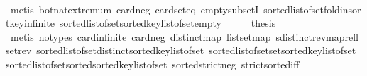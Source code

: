 \begin{isabellebody}
\ \ \ \ \isamarkupfalse%
\ {\isacharparenleft}{\kern0pt}metis\ bot{\isacharunderscore}{\kern0pt}nat{\isacharunderscore}{\kern0pt}{}{\isachardot}{\kern0pt}extremum\ card{\isacharunderscore}{\kern0pt}neg\ card{\isacharunderscore}{\kern0pt}seteq\ empty{\isacharunderscore}{\kern0pt}subsetI\ sorted{\isacharunderscore}{\kern0pt}list{\isacharunderscore}{\kern0pt}of{\isacharunderscore}{\kern0pt}set{\isachardot}{\kern0pt}fold{\isacharunderscore}{\kern0pt}insort{\isacharunderscore}{\kern0pt}key{\isachardot}{\kern0pt}infinite\ sorted{\isacharunderscore}{\kern0pt}list{\isacharunderscore}{\kern0pt}of{\isacharunderscore}{\kern0pt}set{\isachardot}{\kern0pt}sorted{\isacharunderscore}{\kern0pt}key{\isacharunderscore}{\kern0pt}list{\isacharunderscore}{\kern0pt}of{\isacharunderscore}{\kern0pt}set{\isacharunderscore}{\kern0pt}empty{\isacharparenright}{\kern0pt}\isanewline
\ \ \isamarkupfalse%
\ \isamarkupfalse%
\ {\isacharquery}{\kern0pt}thesis\isanewline
\ \ \ \ \isamarkupfalse%
\ {\isacharparenleft}{\kern0pt}metis\ {\isacharparenleft}{\kern0pt}no{\isacharunderscore}{\kern0pt}types{\isacharparenright}{\kern0pt}\ card{\isachardot}{\kern0pt}infinite\ card{\isacharunderscore}{\kern0pt}neg\ distinct{\isacharunderscore}{\kern0pt}map\ list{\isachardot}{\kern0pt}set{\isacharunderscore}{\kern0pt}map\ sdistinct{\isacharunderscore}{\kern0pt}rev{\isacharunderscore}{\kern0pt}map{\isacharunderscore}{\kern0pt}refl\ set{\isacharunderscore}{\kern0pt}rev\ sorted{\isacharunderscore}{\kern0pt}list{\isacharunderscore}{\kern0pt}of{\isacharunderscore}{\kern0pt}set{\isachardot}{\kern0pt}distinct{\isacharunderscore}{\kern0pt}sorted{\isacharunderscore}{\kern0pt}key{\isacharunderscore}{\kern0pt}list{\isacharunderscore}{\kern0pt}of{\isacharunderscore}{\kern0pt}set\ sorted{\isacharunderscore}{\kern0pt}list{\isacharunderscore}{\kern0pt}of{\isacharunderscore}{\kern0pt}set{\isachardot}{\kern0pt}set{\isacharunderscore}{\kern0pt}sorted{\isacharunderscore}{\kern0pt}key{\isacharunderscore}{\kern0pt}list{\isacharunderscore}{\kern0pt}of{\isacharunderscore}{\kern0pt}set\ sorted{\isacharunderscore}{\kern0pt}list{\isacharunderscore}{\kern0pt}of{\isacharunderscore}{\kern0pt}set{\isachardot}{\kern0pt}sorted{\isacharunderscore}{\kern0pt}sorted{\isacharunderscore}{\kern0pt}key{\isacharunderscore}{\kern0pt}list{\isacharunderscore}{\kern0pt}of{\isacharunderscore}{\kern0pt}set\ sortedstrict{\isacharunderscore}{\kern0pt}neg\ strict{\isacharunderscore}{\kern0pt}sorted{\isacharunderscore}{\kern0pt}iff{\isacharparenright}{\kern0pt}\isanewline

\end{isabellebody}
